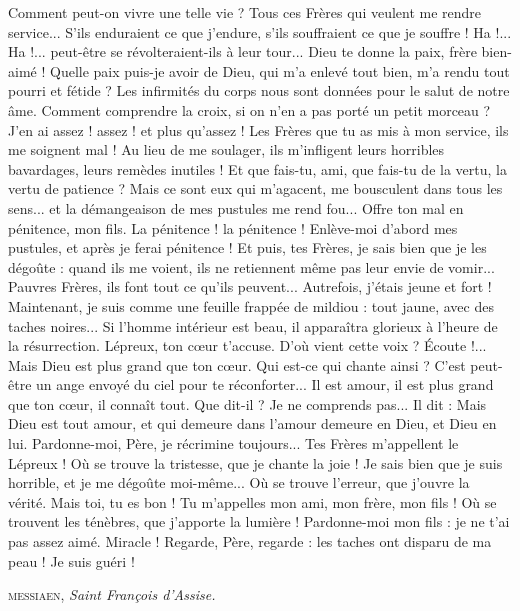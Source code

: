 \documentclass[a5paper,12pt]{article}
\begin{document}
\begin{dialogue}
   Comment peut-on vivre une telle vie ? Tous ces Frères qui veulent me rendre service... S'ils enduraient ce que j'endure, s'ils souffraient ce que je souffre ! Ha !... Ha !... peut-être se révolteraient-ils à leur tour...
   Dieu te donne la paix, frère bien-aimé !
   Quelle paix puis-je avoir de Dieu, qui m'a enlevé tout bien, m'a rendu tout pourri et fétide ?
   Les infirmités du corps nous sont données pour le salut de notre âme. Comment comprendre la croix, si on n'en a pas porté un petit morceau ?
   J'en ai assez ! assez ! et plus qu'assez ! Les Frères que tu as mis à mon service, ils me soignent mal ! Au lieu de me soulager, ils m'infligent leurs horribles bavardages, leurs remèdes inutiles !
   Et que fais-tu, ami, que fais-tu de la vertu, la vertu de patience ?
   Mais ce sont eux qui m'agacent, me bousculent dans tous les sens... et la démangeaison de mes pustules me rend fou...
   Offre ton mal en pénitence, mon fils.
   La pénitence ! la pénitence ! Enlève-moi d'abord mes pustules, et après je ferai pénitence ! Et puis, tes Frères, je sais bien que je les dégoûte : quand ils me voient, ils ne retiennent même pas leur envie de vomir...
   Pauvres Frères, ils font tout ce qu'ils peuvent...
   Autrefois, j'étais jeune et fort ! Maintenant, je suis comme une feuille frappée de mildiou : tout jaune, avec des taches noires...
   Si l'homme intérieur est beau, il apparaîtra glorieux à l'heure de la résurrection.
   Lépreux, ton cœur t'accuse.
   D'où vient cette voix ?
   Écoute !...
   Mais Dieu est plus grand que ton cœur.
   Qui est-ce qui chante ainsi ?
   C'est peut-être un ange envoyé du ciel pour te réconforter...
   Il est amour, il est plus grand que ton cœur, il connaît tout.
   Que dit-il ? Je ne comprends pas...
   Il dit : 
   Mais Dieu est tout amour, et qui demeure dans l'amour demeure en Dieu, et Dieu en lui.
   Pardonne-moi, Père, je récrimine toujours... Tes Frères m'appellent le Lépreux !
   Où se trouve la tristesse, que je chante la joie !
   Je sais bien que je suis horrible, et je me dégoûte moi-même...
   Où se trouve l'erreur, que j'ouvre la vérité.
   Mais toi, tu es bon ! Tu m'appelles mon ami, mon frère, mon fils !
   Où se trouvent les ténèbres, que j'apporte la lumière ! Pardonne-moi mon fils : je ne t'ai pas assez aimé.
    Miracle ! Regarde, Père, regarde : les taches ont disparu de ma peau ! Je suis guéri !
\end{dialogue}

\begin{flushright}
\large
\textsc{messiaen}, \textit{Saint François d'Assise.}
\end{flushright}
\end{document}
